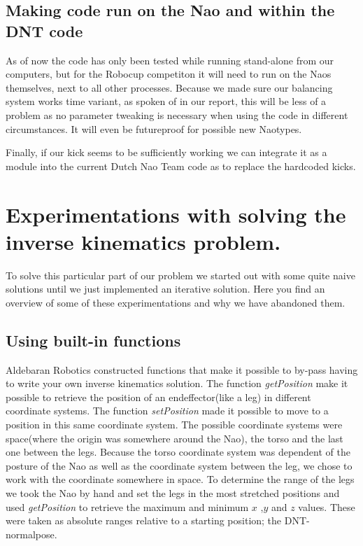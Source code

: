 \documentclass[a4paper]{article}
\begin{document}
\subsection{Making code run on the Nao and within the DNT code} 
As of now the code has only been tested while running stand-alone from our computers, but
for the Robocup competiton it will need to run on the Naos themselves, next to all
other processes. Because we
made sure our balancing system works time variant, as spoken of in our report, this
will be less of a problem as no parameter tweaking is necessary when using the
code in different circumstances. It will even be futureproof for possible new
Naotypes.

Finally, if our kick seems to be sufficiently working we can integrate it as a
module into the current Dutch Nao Team code as to replace the hardcoded kicks.

\appendix
\section{Experimentations with solving the inverse kinematics problem.}
\label{A}
To solve this particular part of our problem we started out with some quite
naive solutions until we just implemented an iterative solution.
Here you find an overview of some of these experimentations and why we have
abandoned them.

\subsection{Using built-in functions}
Aldebaran Robotics constructed functions that make it possible to by-pass having
to write your own inverse kinematics solution. The function \emph{getPosition}
make it possible to retrieve the position of an endeffector(like a leg) in
different coordinate systems. The function  \emph{setPosition} made it possible
to move to a position in this same coordinate system. The possible coordinate
systems were space(where the origin was somewhere around the Nao), the torso
and the last one between the legs. Because the torso coordinate system was
dependent of the posture of the Nao as well as the coordinate system between
the leg, we chose to work with the coordinate somewhere in space.
To determine the range of the legs we took the Nao by hand and set the legs in
the most stretched positions and used \emph{getPosition} to retrieve the
maximum and minimum $x$ ,$y$ and $z$ values.  These were taken as absolute
ranges relative to a starting position; the DNT-normalpose.
\end{document}
